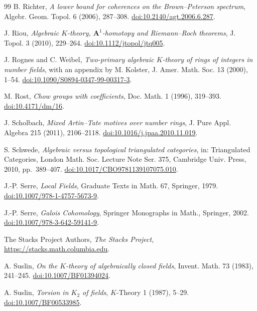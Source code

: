 \begin{thebibliography}{99}
 B. Richter,
\emph{A lower bound for coherences on the Brown--Peterson spectrum},
Algebr. Geom. Topol. 6 (2006), 287--308.
\href{https://doi.org/10.2140/agt.2006.6.287}{doi:10.2140/agt.2006.6.287}.

 J. Riou,
\emph{Algebraic $K$-theory, $\mathbf A^1$-homotopy and Riemann--Roch theorems},
J. Topol. 3 (2010), 229--264.
\href{https://doi.org/10.1112/jtopol/jtq005}{doi:10.1112/jtopol/jtq005}.

 J. Rognes and C. Weibel,
\emph{Two-primary algebraic \(K\)-theory of rings of integers in number fields},
with an appendix by M. Kolster,
J. Amer. Math. Soc. 13 (2000), 1--54.
\href{https://doi.org/10.1090/S0894-0347-99-00317-3}{doi:10.1090/S0894-0347-99-00317-3}.

 M. Rost,
\emph{Chow groups with coefficients},
Doc. Math. 1 (1996), 319--393.
\href{https://doi.org/10.4171/dm/16}{doi:10.4171/dm/16}.

 J. Scholbach,
\emph{Mixed Artin--Tate motives over number rings},
J. Pure Appl. Algebra 215 (2011), 2106--2118.
\href{https://doi.org/10.1016/j.jpaa.2010.11.019}{doi:10.1016/j.jpaa.2010.11.019}.

 S. Schwede,
\emph{Algebraic versus topological triangulated categories},
in: Triangulated Categories, London Math. Soc. Lecture Note Ser. 375, Cambridge Univ. Press, 2010, pp.~389--407.
\href{https://doi.org/10.1017/CBO9781139107075.010}{doi:10.1017/CBO9781139107075.010}.

 J.-P. Serre,
\emph{Local Fields},
Graduate Texts in Math. 67, Springer, 1979.
\href{https://doi.org/10.1007/978-1-4757-5673-9}{doi:10.1007/978-1-4757-5673-9}.

 J.-P. Serre,
\emph{Galois Cohomology},
Springer Monographs in Math., Springer, 2002.
\href{https://doi.org/10.1007/978-3-642-59141-9}{doi:10.1007/978-3-642-59141-9}.

 The Stacks Project Authors,
\emph{The Stacks Project},
\href{https://stacks.math.columbia.edu}{https://stacks.math.columbia.edu}.

 A. Suslin,
\emph{On the $K$-theory of algebraically closed fields},
Invent. Math. 73 (1983), 241--245.
\href{https://doi.org/10.1007/BF01394024}{doi:10.1007/BF01394024}.

 A. Suslin,
\emph{Torsion in $K_2$ of fields},
$K$-Theory 1 (1987), 5--29.
\href{https://doi.org/10.1007/BF00533985}{doi:10.1007/BF00533985}.


\end{thebibliography}
